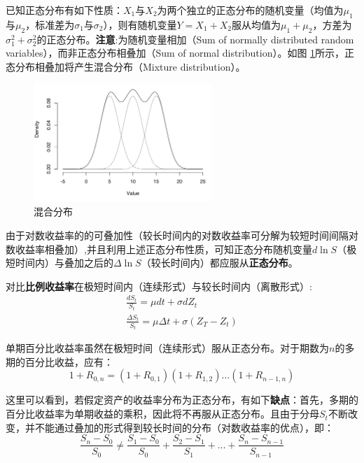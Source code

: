 \documentclass[11pt]{article}
\begin{document}
已知正态分布有如下性质：$X_1$与$X_2$为两个独立的正态分布的随机变量（均值为$\mu_1$与$\mu_2$，标准差为$\sigma_1$与$\sigma_2$），则有随机变量$Y=X_1+X_2$服从均值为$\mu_1+\mu_2$，方差为$\sigma_1^2+\sigma_2^2$的正态分布。\textbf{注意}:为随机变量相加（Sum of normally distributed random variables），而非正态分布相叠加（Sum of normal distribution）。如图
\ref{fig:mix-dist}所示，正态分布相叠加将产生混合分布（Mixture distribution）。
\begin{figure}[H]
    \centering
    \includegraphics[width=0.6\textwidth]{fig/gaussian-mixture-distribution.png}
    \caption{混合分布}
    \label{fig:mix-dist}
\end{figure}

由于对数收益率的的可叠加性（较长时间内的对数收益率可分解为较短时间间隔对数收益率相叠加）,并且利用上述正态分布性质，可知正态分布随机变量$d\ln S$（极短时间内）与叠加之后的$\Delta \ln S$（较长时间内）都应服从\textbf{正态分布}。

对比\textbf{比例收益率}在极短时间内（连续形式）与较长时间内（离散形式）:
\begin{gather*}
    \frac{dS_t}{S_t} = \mu dt + \sigma dZ_t \\
    \frac{\Delta S_t}{S_t} = \mu \Delta t + \sigma(Z_T - Z_t)
\end{gather*}

单期百分比收益率虽然在极短时间（连续形式）服从正态分布。对于期数为$n$的多期的百分比收益，应有：
\begin{equation*}
    1+R_{0,n} = (1+R_{0,1})(1+R_{1,2})\dots(1+R_{n-1,n})
\end{equation*}

这里可以看到，若假定资产的收益率分布为正态分布，有如下\textbf{缺点}：首先，多期的百分比收益率为单期收益的乘积，因此将不再服从正态分布。且由于分母$S_t$不断改变，并不能通过叠加的形式得到较长时间的分布（对数收益率的优点），即：
\begin{equation*}
    \frac{S_n - S_0}{S_0} \neq \frac{S_1- S_0}{S_0} + \frac{S_2-S_1}{S_1} + \dots + \frac{S_{n}-S_{n-1}}{S_{n-1}}
\end{equation*}
\end{document}
